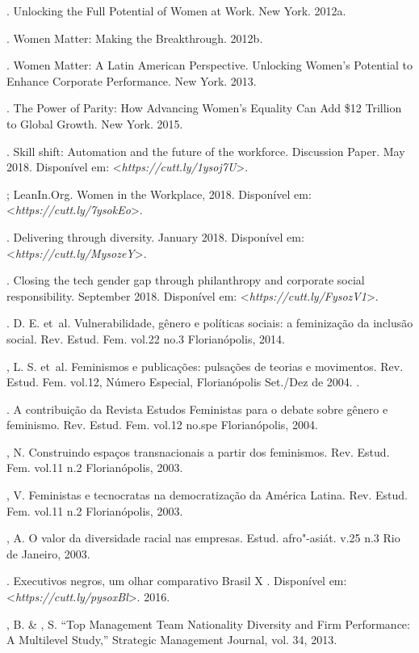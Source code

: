 \begin{bibliohedra}
\titidem. Unlocking the Full Potential of Women at Work. New
York. 2012a.

\titidem. Women Matter: Making the Breakthrough. 2012b.

\titidem. Women Matter: A Latin American Perspective.
Unlocking Women's Potential to Enhance Corporate Performance. New York.
2013.

\titidem. The Power of Parity: How Advancing Women's Equality
Can Add \$12 Trillion to Global Growth. New York. 2015.

\titidem. Skill shift: Automation and the future of the
workforce. Discussion Paper. May 2018.
Disponível em: \textless{}\emph{https://cutt.ly/1ysoj7U}\textgreater{}.

\titidem; LeanIn.Org. Women in the Workplace, 2018.
Disponível em: \textless{}\emph{https://cutt.ly/7ysokEo}\textgreater{}.

\titidem. Delivering through diversity. January 2018.
Disponível em: \textless{}\emph{https://cutt.ly/MysozeY}\textgreater{}.

\titidem. Closing the tech gender gap through philanthropy
and corporate social responsibility. September 2018.
Disponível em: \textless{}\emph{https://cutt.ly/FysozV1}\textgreater{}.

. D. E. et~al. Vulnerabilidade, gênero e políticas sociais: a
feminização da inclusão social. Rev. Estud. Fem. vol.22 no.3
Florianópolis, 2014.

, L. S. et~al. Feminismos e publicações: pulsações de teorias e
movimentos. Rev. Estud. Fem. vol.12, Número Especial, Florianópolis
Set./Dez de 2004. .

\titidem. A contribuição da Revista Estudos Feministas para o
debate sobre gênero e feminismo. Rev. Estud. Fem. vol.12 no.spe
Florianópolis, 2004.

, N. Construindo espaços transnacionais a partir dos feminismos.
Rev. Estud. Fem. vol.11 n.2 Florianópolis, 2003.

, V. Feministas e tecnocratas na democratização da América
Latina. Rev. Estud. Fem. vol.11 n.2 Florianópolis, 2003.

, A. O valor da diversidade racial nas empresas. Estud. afro"-asiát.
v.25 n.3 Rio de Janeiro, 2003.

\titidem. Executivos negros, um olhar comparativo Brasil X .
Disponível em: \textless{}\emph{https://cutt.ly/pysoxBl}\textgreater{}.
2016.

, B. \& , S. ``Top Management Team Nationality Diversity
and Firm Performance: A Multilevel Study,'' Strategic Management
Journal, vol. 34, 2013.


\end{bibliohedra}
